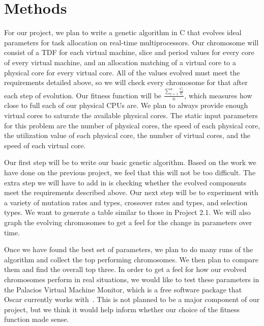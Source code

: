 \documentclass[11pt]{article}
\begin{document}
\section{Methods}

For our project, we plan to write a genetic algorithm in C that evolves ideal parameters for task allocation on real-time multiprocessors. Our chromosome will consist of a TDF for each virtual machine, slice and period values for every core of every virtual machine, and an allocation matching of a virtual core to a physical core for every virtual core. All of the values evolved must meet the requirements detailed above, so we will check every chromosome for that after each step of evolution. Our fitness function will be $\frac{\sum_{i=1}^{n} \frac{C_{i}}{T_{i}}}{n}$, which measures how close to full each of our physical CPUs are. We plan to always provide enough virtual cores to saturate the available physical cores. The static input parameters for this problem are the number of physical cores, the speed of each physical core, the utilization value of each physical core, the number of virtual cores, and the speed of each virtual core.

Our first step will be to write our basic genetic algorithm. Based on the work we have done on the previous project, we feel that this will not be too difficult. The extra step we will have to add in is checking whether the evolved components meet the requirements described above. Our next step will be to experiment with a variety of mutation rates and types, crossover rates and types, and selection types. We want to generate a table similar to those in Project 2.1. We will also graph the evolving chromosomes to get a feel for the change in parameters over time.

Once we have found the best set of parameters, we plan to do many runs of the algorithm and collect the top performing chromosomes. We then plan to compare them and find the overall top three. In order to get a feel for how our evolved chromosomes perform in real situations, we would like to test these parameters in the Palacios Virtual Machine Monitor, which is a free software package that Oscar currently works with~\cite{Mondragon:13}. This is not planned to be a major component of our project, but we think it would help inform whether our choice of the fitness function made sense. 



\end{document}

